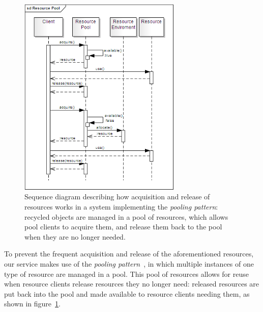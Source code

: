 \documentclass[11pt]{article}
\begin{document}



\begin{figure}[!ht]
\begin{center}
\includegraphics[width=7.75cm]{resource_pool}
\end{center}
\caption{Sequence diagram describing how acquisition and release of resources works in a system implementing the \emph{pooling pattern}: recycled objects are managed in a pool of resources, which allows pool clients to acquire them, and release them back to the pool when they are no longer needed.}
\label{fig:rp}
\end{figure}

To prevent the frequent acquisition and release of the aforementioned resources, our service makes use of the \emph{pooling pattern}~\citep{kircher2001}, in which multiple instances of one type of resource are managed in a pool. This pool of resources allows for reuse when resource clients release resources they no longer need: released resources are put back into the pool and made available to resource clients needing them, as shown in figure~\ref{fig:rp}.
\end{document}
